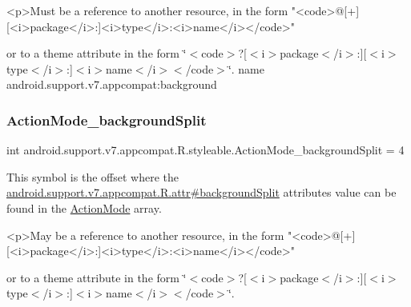 \begin{DoxyVerb}      <p>Must be a reference to another resource, in the form "<code>@[+][<i>package</i>:]<i>type</i>:<i>name</i></code>"
\end{DoxyVerb}
 or to a theme attribute in the form \char`\"{}$<$code$>$?\mbox{[}$<$i$>$package$<$/i$>$\+:\mbox{]}\mbox{[}$<$i$>$type$<$/i$>$\+:\mbox{]}$<$i$>$name$<$/i$>$$<$/code$>$\char`\"{}.  name android.\+support.\+v7.\+appcompat\+:background \mbox{\label{classandroid_1_1support_1_1v7_1_1appcompat_1_1R_1_1styleable_a846fc9b3ed73107bff2246293ce7763e}} 
\subsubsection{\texorpdfstring{Action\+Mode\+\_\+background\+Split}{ActionMode\_backgroundSplit}}
{\footnotesize\ttfamily int android.\+support.\+v7.\+appcompat.\+R.\+styleable.\+Action\+Mode\+\_\+background\+Split = 4\hspace{0.3cm}{\ttfamily [static]}}

This symbol is the offset where the \hyperlink{classandroid_1_1support_1_1v7_1_1appcompat_1_1R_1_1attr_a39a8f294508e3340e83275f406757bfc}{android.\+support.\+v7.\+appcompat.\+R.\+attr\#background\+Split} attribute\textquotesingle{}s value can be found in the \hyperlink{classandroid_1_1support_1_1v7_1_1appcompat_1_1R_1_1styleable_ac4197f1a9a85a8f5973cc5efa358ad9f}{Action\+Mode} array.

\begin{DoxyVerb}      <p>May be a reference to another resource, in the form "<code>@[+][<i>package</i>:]<i>type</i>:<i>name</i></code>"
\end{DoxyVerb}
 or to a theme attribute in the form \char`\"{}$<$code$>$?\mbox{[}$<$i$>$package$<$/i$>$\+:\mbox{]}\mbox{[}$<$i$>$type$<$/i$>$\+:\mbox{]}$<$i$>$name$<$/i$>$$<$/code$>$\char`\"{}. 


